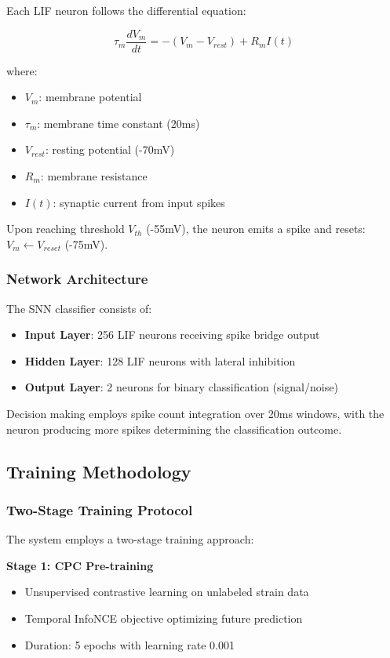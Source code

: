 \documentclass[12pt,a4paper]{article}
\begin{document}
Each LIF neuron follows the differential equation:

\begin{equation}
\tau_m \frac{dV_m}{dt} = -(V_m - V_{rest}) + R_m I(t)
\end{equation}

where:
\begin{itemize}
\item $V_m$: membrane potential
\item $\tau_m$: membrane time constant (20ms)
\item $V_{rest}$: resting potential (-70mV)
\item $R_m$: membrane resistance
\item $I(t)$: synaptic current from input spikes
\end{itemize}

Upon reaching threshold $V_{th}$ (-55mV), the neuron emits a spike and resets: $V_m \leftarrow V_{reset}$ (-75mV).

\subsubsection{Network Architecture}

The SNN classifier consists of:
\begin{itemize}
\item \textbf{Input Layer}: 256 LIF neurons receiving spike bridge output
\item \textbf{Hidden Layer}: 128 LIF neurons with lateral inhibition
\item \textbf{Output Layer}: 2 neurons for binary classification (signal/noise)
\end{itemize}

Decision making employs spike count integration over 20ms windows, with the neuron producing more spikes determining the classification outcome.

\subsection{Training Methodology}

\subsubsection{Two-Stage Training Protocol}

The system employs a two-stage training approach:

\textbf{Stage 1: CPC Pre-training}
\begin{itemize}
\item Unsupervised contrastive learning on unlabeled strain data
\item Temporal InfoNCE objective optimizing future prediction
\item Duration: 5 epochs with learning rate 0.001
\end{itemize}
\end{document}
